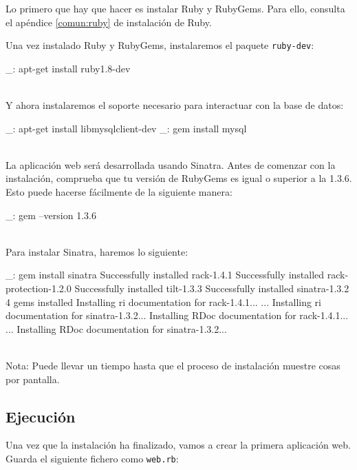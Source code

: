 Lo primero que hay que hacer es instalar Ruby y RubyGems. Para ello, consulta el apéndice \ref{comun:ruby} de instalación de Ruby.

Una vez instalado Ruby y RubyGems, instalaremos el paquete \texttt{ruby-dev}:

\begin{bashcode}
_: apt-get install ruby1.8-dev
\end{bashcode}
\\

Y ahora instalaremos el soporte necesario para interactuar con la base de datos:

\begin{bashcode}
_: apt-get install libmysqlclient-dev
_: gem install mysql
\end{bashcode}
\\

La aplicación web será desarrollada usando Sinatra. Antes de comenzar con la instalación, comprueba que tu versión de RubyGems es igual o superior a la 1.3.6. Esto puede hacerse fácilmente de la siguiente manera:

\begin{bashcode}
_: gem --version
1.3.6
\end{bashcode}
\\

Para instalar Sinatra, haremos lo siguiente:

\begin{bashcode}
_: gem install sinatra
Successfully installed rack-1.4.1
Successfully installed rack-protection-1.2.0
Successfully installed tilt-1.3.3
Successfully installed sinatra-1.3.2
4 gems installed
Installing ri documentation for rack-1.4.1...
...
Installing ri documentation for sinatra-1.3.2...
Installing RDoc documentation for rack-1.4.1...
...
Installing RDoc documentation for sinatra-1.3.2...
\end{bashcode}
\\

Nota: Puede llevar un tiempo hasta que el proceso de instalación muestre cosas por pantalla.


\subsection{Ejecución}

Una vez que la instalación ha finalizado, vamos a crear la primera aplicación web. Guarda el siguiente fichero como \texttt{web.rb}:

